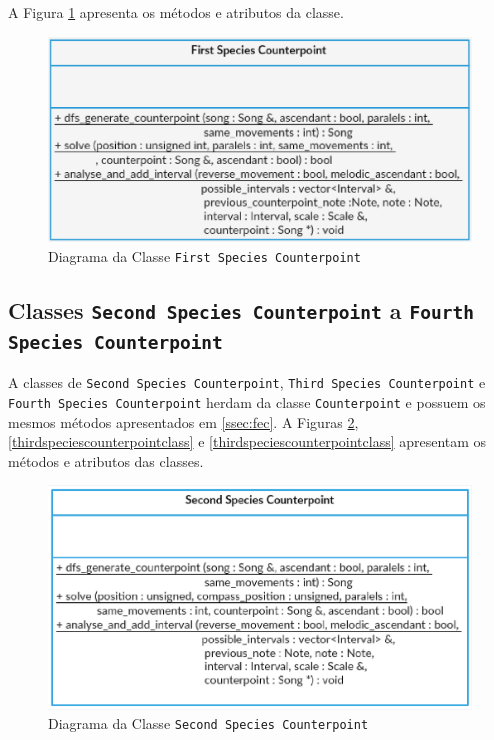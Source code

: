       A Figura \ref{firstspeciescounterpointclass} apresenta os métodos e atributos da classe.

      \begin{figure}[htb]
        \centering
        \includegraphics[scale=0.7]{figuras/firstspeciescounterpointclass.eps}
        \caption{Diagrama da Classe \texttt{First Species Counterpoint}}
        \label{firstspeciescounterpointclass}
      \end{figure}

    \subsection[Classes \texttt{Second Species Counterpoint} a \texttt{Fourth Species Counterpoint}]{Classes \texttt{Second Species Counterpoint} a \texttt{Fourth Species Counterpoint}}

      A classes de \texttt{Second Species Counterpoint}, \texttt{Third Species Counterpoint} e \texttt{Fourth Species Counterpoint} herdam da classe \texttt{Counterpoint} e possuem os mesmos métodos apresentados em \ref{ssec:fec}. A Figuras \ref{secondspeciescounterpointclass}, \ref{thirdspeciescounterpointclass} e \ref{thirdspeciescounterpointclass} apresentam os métodos e atributos das classes.

      \begin{figure}[htb]
        \centering
        \includegraphics[scale=0.7]{figuras/secondspeciescounterpointclass.eps}
        \caption{Diagrama da Classe \texttt{Second Species Counterpoint}}
        \label{secondspeciescounterpointclass}
      \end{figure}

